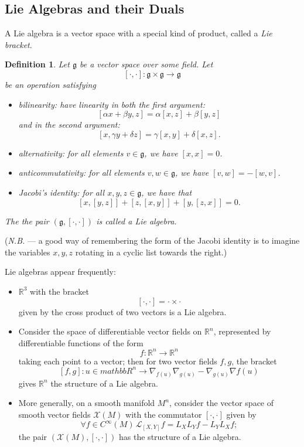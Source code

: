 \documentclass{tufte-handout}
\newtheorem{defn}{Definition}
\begin{document}
\subsection{Lie Algebras and their Duals}
A Lie algebra is a vector space with a special kind of product, called a \emph{Lie bracket}.
\begin{fullwidth}
\begin{defn}
Let $\mathfrak{g}$ be a vector space over some field. Let
$$
[\cdot, \cdot]: \mathfrak{g} \times \mathfrak{g} \to \mathfrak{g}
$$
be an operation satisfying
\begin{itemize}
\item bilinearity: have linearity in both the first argument:
$$
[\alpha x + \beta y, z] = \alpha [x,z] + \beta [y,z]
$$
and in the second argument:
$$
[x,\gamma y + \delta z] = \gamma [x,y] + \delta [x,z].
$$
\item alternativity: for all elements $v \in \mathfrak{g}$, we have $[x,x] = 0$.
\item anticommutativity: for all elements $v,w \in \mathfrak{g}$, we have $[v,w] = -[w,v]$.
\item \emph{Jacobi's identity}: for all $x,y,z \in \mathfrak{g}$, we have that
$$
[x,[y,z]] + [z,[x,y]] + [y,[z,x]] = 0.
$$
\end{itemize}

The the pair $(\mathfrak{g},[\cdot, \cdot])$ is called a \emph{Lie algebra}.
\end{defn}
\end{fullwidth}
(\emph{N.B.} --- a good way of remembering the form of the Jacobi identity is to imagine the variables $x,y,z$ rotating in a cyclic list towards the right.)

Lie algebras appear frequently:
\begin{itemize}
\item $\mathbb{R}^3$ with the bracket
$$
[\cdot,\cdot] = \cdot \times \cdot
$$
given by the cross product of two vectors is a Lie algebra.
\item Consider the space of differentiable vector fields on $\mathbb{R}^n$, represented by differentiable functions of the form
$$
f: \mathbb{R}^n \to \mathbb{R}^n
$$
taking each point to a vector; then for two vector fields $f,g$, the bracket
$$
[f,g]: u \in mathbb{R}^n \to \nabla_{f(u)}\nabla_{g(u)} - \nabla_{g(u)}\nabla{f(u)}
$$
gives $\mathbb{R}^n$ the structure of a Lie algebra. %
\item More generally, on a smooth manifold $M^n$, consider the vector space of smooth vector fields $\mathcal{X}(M)$ with the commutator $[\cdot,\cdot]$ given by
$$
\forall f \in C^\infty(M) \, \mathcal{L}_{[X,Y]}f = L_XL_Yf - L_YL_Xf;
$$
the pair $(\mathcal{X}(M),[\cdot,\cdot])$ has the structure of a Lie algebra.
\end{itemize}
\end{document}
